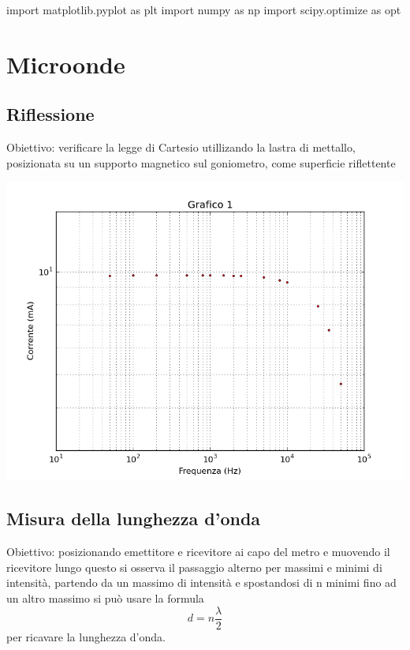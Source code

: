 \begin{sagesilent}
import matplotlib.pyplot as plt
import numpy as np
import scipy.optimize as opt
\end{sagesilent}


\chapter{Microonde}

\section{Riflessione}

Obiettivo: verificare la legge di Cartesio utillizando la lastra di mettallo, posizionata su un supporto magnetico sul
goniometro, come superficie riflettente

\begin{center}
\includegraphics[scale=0.75]{grafici/C2-1.png} 
\end{center}

\section{Misura della lunghezza d'onda}
Obiettivo: posizionando emettitore e ricevitore ai capo del metro e muovendo il ricevitore lungo questo si osserva il
passaggio alterno per massimi e minimi di intensità, partendo da un massimo di intensità e spostandosi di n minimi fino ad
un altro massimo si può usare la formula
$$d = n\frac{\lambda}{2}$$
per ricavare la lunghezza d’onda.


